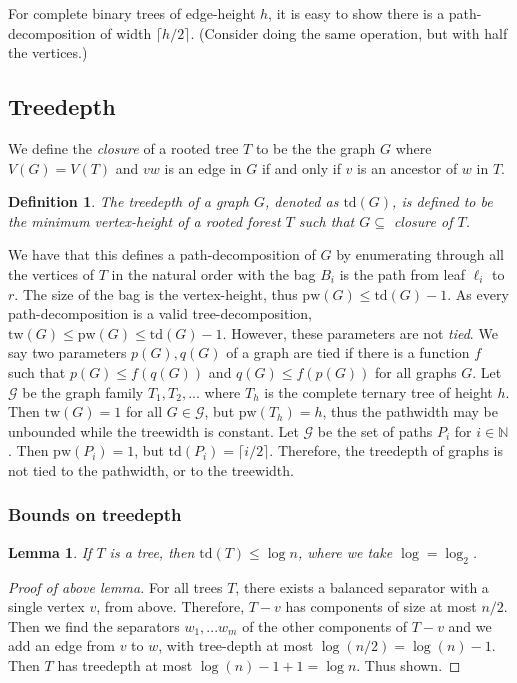 \documentclass[]{article}
\newcommand{\tw}{\text{tw}}
\newcommand{\pw}{\text{pw}}
\newcommand{\td}{\text{td}}
\newtheorem{lemma}[theorem]{Lemma}
\newtheorem{definition}[theorem]{Definition}
\theoremstyle{definition}
\numberwithin{theorem}{section}
\numberwithin{equation}{section}
\begin{document}
For complete binary trees of edge-height $h$, it is easy to show there is a path-decomposition of width $\lceil h/2 \rceil$. (Consider doing the same operation, but with half the vertices.)

\subsection{Treedepth}
We define the \textit{closure} of a rooted tree $T$ to be the the graph $G$ where $V(G) = V(T)$ and $vw$ is an edge in $G$ if and only if $v$ is an ancestor of $w$ in $T$.
\begin{definition}
	The treedepth of a graph $G$, denoted as $\td(G)$, is defined to be the minimum vertex-height of a rooted forest $T$ such that $G \subseteq $ closure of $T$.
\end{definition}
We have that this defines a path-decomposition of $G$ by enumerating through all the vertices of $T$ in the natural order with the bag $B_i$ is the path from leaf $\ell_i$ to $r$. The size of the bag is the vertex-height, thus $\pw(G) \leq \td(G) - 1$. As every path-decomposition is a valid tree-decomposition, $\tw(G) \leq \pw(G) \leq \td(G) - 1$. However, these parameters are not \textit{tied}. We say two parameters $p(G), q(G)$ of a graph are tied if there is a function $f$ such that $ p(G) \leq f(q(G))$ and $q(G) \leq f(p(G))$ for all graphs $G$. 
Let $\mathcal{G}$ be the graph family $T_1, T_2, ...$ where $T_h$ is the complete ternary tree of height $h$. Then $\tw(G) = 1$ for all $G \in \mathcal{G}$, but $\pw(T_h) = h$, thus the pathwidth may be unbounded while the treewidth is constant. Let $\mathcal{G}$ be the set of paths $P_i$ for $i \in \mathbb{N}$. Then $\pw(P_i) =  1$, but $\td(P_i) = \lceil i/2 \rceil$. Therefore, the treedepth of graphs is not tied to the pathwidth, or to the treewidth.
\subsubsection{Bounds on treedepth}
\begin{lemma}
	If $T$ is a tree, then $\td(T) \leq \log n$, where we take $\log = \log_2$. 
\end{lemma}
\begin{proof}[Proof of above lemma]
	For all trees $T$, there exists a balanced separator with a single vertex $v$, from above. Therefore, $T-v$ has components of size at most $n/2$. Then we find the separators $w_1,... w_m$ of the other components of $T - v$ and we add an edge from $v$ to $w$, with tree-depth at most $\log(n/2) = \log(n) - 1$. Then $T$ has treedepth at most $\log(n) - 1 + 1 = \log n$. Thus shown. 
\end{proof}
\end{document}
